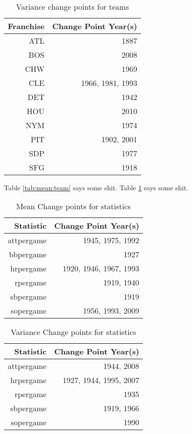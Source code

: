\documentclass[USenglish]{article}
\theoremstyle{dgthm}
\theoremstyle{dgdef}
\begin{document}
 

\begin{table}
\begin{tabular}{|r|r|}
Franchise & Change Point Year(s) \\
\hline
ATL       &1887             \\
BOS       &2008             \\
CHW       &1969             \\
CLE       &1966, 1981, 1993 \\
DET       &1942             \\
HOU       &2010             \\
NYM       &1974             \\
PIT       &1902, 2001       \\
SDP       &1977             \\
SFG       &1918             \\
\end{tabular}
\caption{Variance change points for teams}
\label{tab:var:team}
\end{table}

Table \ref{tab:mean:team} says some shit.  
Table \ref{tab:var:team} says some shit. 


\begin{table}
\begin{tabular}{|r|r|}
Statistic & Change Point Year(s) \\
\hline
attpergame &1945, 1975, 1992       \\
bbpergame  &1927                   \\
hrpergame  &1920, 1946, 1967, 1993 \\
rpergame   &1919, 1940             \\
sbpergame  &1919                   \\
sopergame  &1956, 1993, 2009       \\
\end{tabular}
\caption{Mean Change points for statistics}
\label{tab:mean:stat}
\end{table}

\begin{table}
\begin{tabular}{|r|r|}
Statistic & Change Point Year(s) \\
\hline
attpergame &1944, 2008             \\
hrpergame  &1927, 1944, 1995, 2007 \\
rpergame   &1935                   \\
sbpergame  &1919, 1966             \\
sopergame  &1990                   \\
\end{tabular}
\caption{Variance Change points for statistics}
\label{tab:var:stat}
\end{table}
\end{document}
